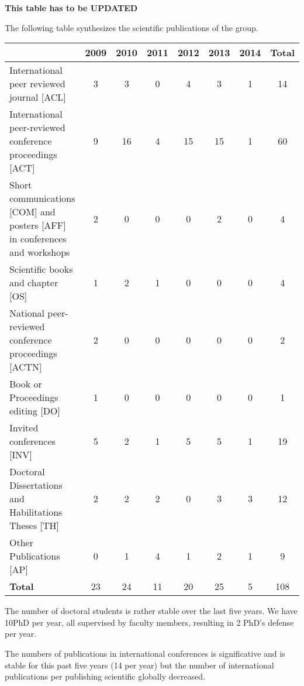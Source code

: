 

{\bf This table has to be UPDATED }


The following table synthesizes the scientific publications of the group.
\begin{center}\begin{tabular}{|p{6cm}|*{7}{c|}}
\hline
~ &2009 &2010 &2011 &2012 &2013 &2014 & \textbf{Total} \\
\hline
International peer reviewed journal [ACL] & 3  & 3  & 0  & 4  & 3  & 1  & 14 \\
\hline
International peer-reviewed conference proceedings [ACT] & 9  & 16  & 4  & 15  & 15  & 1  & 60 \\
\hline
Short communications [COM] and posters [AFF] in conferences and workshops & 2  & 0  & 0  & 0  & 2  & 0  & 4 \\
\hline
Scientific books and chapter [OS] & 1  & 2  & 1  & 0  & 0  & 0  & 4 \\
\hline
National peer-reviewed conference proceedings [ACTN] & 2  & 0  & 0  & 0  & 0  & 0  & 2 \\
\hline
Book or Proceedings editing [DO] & 1  & 0  & 0  & 0  & 0  & 0  & 1 \\
\hline
Invited conferences [INV] & 5  & 2  & 1  & 5  & 5  & 1  & 19 \\
\hline
Doctoral Dissertations and Habilitations Theses [TH] & 2  & 2  & 2  & 0  & 3  & 3  & 12 \\
\hline
Other Publications [AP] & 0  & 1  & 4  & 1  & 2  & 1  & 9 \\
\hline \textbf{Total} &23&24&11&20&25&5 &108\\
\hline
\end{tabular}\end{center}
\makeatother


The number of doctoral students is rather stable over the last five years. We have 10PhD per year, all supervised by faculty members, resulting in 2 PhD's defense per year. 

The numbers of publications in international conferences is significative and is stable for this past five years (14 per year) but the number of international publications per publishing scientific globally decreased. 


